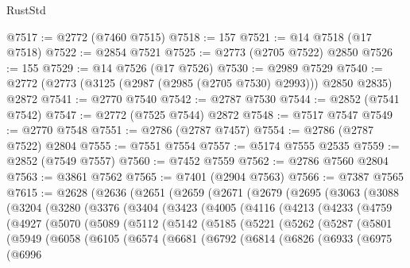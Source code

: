 \begin{lexlean}{RustStd}
\begin{coremodule}
@7517 := @2772 (@7460 @7515)
@7518 := 157
@7521 := @14 @7518 (@17 @7518)
@7522 := @2854 @7521
@7525 := @2773 (@2705 @7522) @2850
@7526 := 155
@7529 := @14 @7526 (@17 @7526)
@7530 := @2989 @7529
@7540 := @2772 (@2773 (@3125 (@2987 (@2985 (@2705 @7530) @2993))) @2850 @2835) @2872
@7541 := @2770 @7540
@7542 := @2787 @7530
@7544 := @2852 (@7541 @7542)
@7547 := @2772 (@7525 @7544) @2872
@7548 := @7517 @7547
@7549 := @2770 @7548
@7551 := @2786 (@2787 @7457)
@7554 := @2786 (@2787 @7522) @2804
@7555 := @7551 @7554
@7557 := @5174 @7555 @2535
@7559 := @2852 (@7549 @7557)
@7560 := @7452 @7559
@7562 := @2786 @7560 @2804
@7563 := @3861 @7562
@7565 := @7401 (@2904 @7563)
@7566 := @7387 @7565
@7615 := @2628
    (@2636
      (@2651
        (@2659
          (@2671
            (@2679
              (@2695
                (@3063
                  (@3088
                    (@3204
                      (@3280
                        (@3376
                          (@3404
                            (@3423
                              (@4005
                                (@4116
                                  (@4213
                                    (@4233
                                      (@4759
                                        (@4927
                                          (@5070
                                            (@5089
                                              (@5112
                                                (@5142
                                                  (@5185
                                                    (@5221
                                                      (@5262
                                                        (@5287
                                                          (@5801
                                                            (@5949
                                                              (@6058
                                                                (@6105
                                                                  (@6574
                                                                    (@6681
                                                                      (@6792
                                                                        (@6814
                                                                          (@6826
                                                                            (@6933
                                                                              (@6975
                                                                                (@6996

\end{coremodule}
\end{lexlean}
